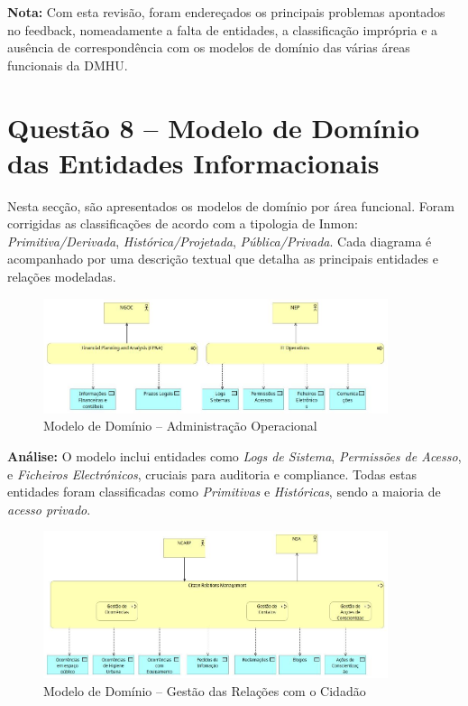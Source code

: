 \documentclass[12pt,a4paper,final]{article}
\begin{document}
\begin{longtable}{|p{6cm}|p{7cm}|}
    \end{longtable}

    \textbf{Nota:} Com esta revisão, foram endereçados os principais problemas apontados no feedback, nomeadamente a falta de entidades, a classificação imprópria e a ausência de correspondência com os modelos de domínio das várias áreas funcionais da DMHU.



    \newpage
    \section*{Questão 8 – Modelo de Domínio das Entidades Informacionais}

    Nesta secção, são apresentados os modelos de domínio por área funcional. Foram corrigidas as classificações de acordo com a tipologia de Inmon: \textit{Primitiva/Derivada}, \textit{Histórica/Projetada}, \textit{Pública/Privada}. Cada diagrama é acompanhado por uma descrição textual que detalha as principais entidades e relações modeladas.

    \begin{figure}[H]
        \centering
        \includegraphics[width=0.9\textwidth]{Q8 - Domain Model For Information Entities - Admin Ops.jpg}
        \caption{Modelo de Domínio – Administração Operacional}
        \label{fig:q8-adminops}
    \end{figure}

    \textbf{Análise:} O modelo inclui entidades como \textit{Logs de Sistema}, \textit{Permissões de Acesso}, e \textit{Ficheiros Electrónicos}, cruciais para auditoria e compliance. Todas estas entidades foram classificadas como \textit{Primitivas} e \textit{Históricas}, sendo a maioria de \textit{acesso privado}.

    \begin{figure}[H]
        \centering
        \includegraphics[width=0.9\textwidth]{Q8 - Domain Model For Information Entities - Citzen Relationship Management.jpg}
        \caption{Modelo de Domínio – Gestão das Relações com o Cidadão}
        \label{fig:q8-cidadao}
    \end{figure}
\end{document}
